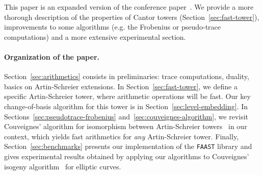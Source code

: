 This paper is an expanded version of the conference
paper~\cite{DeSc09}. We provide a more thorough description of the
properties of Cantor towers (Section~\ref{sec:fast-tower}),
improvements to some algorithms (e.g. the Frobenius or pseudo-trace
computations) and a more extensive experimental section.

\paragraph*{\bf Organization of the paper.}
Section~\ref{sec:arithmetics} consists in preliminaries: trace
computations, duality, basics on Artin-Schreier extensions. In
Section~\ref{sec:fast-tower}, we define a specific Artin-Schreier
tower, where arithmetic operations will be fast. Our key
change-of-basis algorithm for this tower is in
Section~\ref{sec:level-embedding}. In
Sections~\ref{sec:pseudotrace-frobenius}
and~\ref{sec:couveignes-algorithm}, we revisit Couveignes' algorithm
for isomorphism between Artin-Schreier towers~\cite{Couveignes00} in
our context, which yields fast arithmetics for {\em any}
Artin-Schreier tower. Finally, Section~\ref{sec:benchmarks} presents
our implementation of the \texttt{FAAST} library and gives
experimental results obtained by applying our algorithms to
Couveignes' isogeny algorithm~\cite{Couveignes96} for elliptic curves.




%
